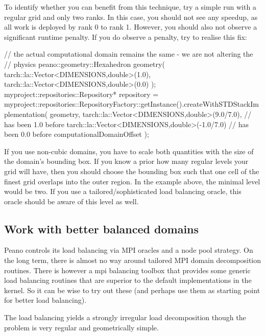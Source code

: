 To identify whether you can benefit from this technique, try a simple run with a
regular grid and only two ranks. 
In this case, you should not see any speedup, as all work is deployed by rank 0 to rank 1. 
However, you should also not observe a significant runtime penalty. 
If you do observe a penalty, try to realise this fix:


\begin{code}
// the actual computational domain remains the same - we are not altering the
// physics
peano::geometry::Hexahedron geometry(
  tarch::la::Vector<DIMENSIONS,double>(1.0),
  tarch::la::Vector<DIMENSIONS,double>(0.0) );
myproject::repositories::Repository* repository = 
  myproject::repositories::RepositoryFactory::getInstance().createWithSTDStackImplementation(
  geometry,
  tarch::la::Vector<DIMENSIONS,double>(9.0/7.0),   // has been 1.0 before
  tarch::la::Vector<DIMENSIONS,double>(-1.0/7.0)   // has been 0.0 before
  computationalDomainOffset );
\end{code}

\begin{remark}
If you use non-cubic domains, you have to scale both quantities with the size of
the domain's bounding box.
If you know a prior how many regular levels your grid will have, then you should
choose the bounding box such that one cell of the finest grid overlaps into the
outer region. 
In the example above, the minimal level would be two.
If you use a tailored/sophisticated load balancing oracle, this oracle should be
aware of this level as well.
\end{remark}



\subsection{Work with better balanced domains}

\noindent
Peano controls its load balancing via MPI oracles and a node pool strategy. 
On the long term, there is almost no way around tailored MPI domain
decomposition routines.
There is however a mpi balancing toolbox that provides some generic load
balancing routines that are superior to the default implementations in the
kernel.
So it can be wise to try out these (and perhaps use them as starting point for
better load balancing).

\begin{smell}
  The load balancing yields a strongly irregular load decomposition though the
  problem is very regular and geometrically simple.
\end{smell}

